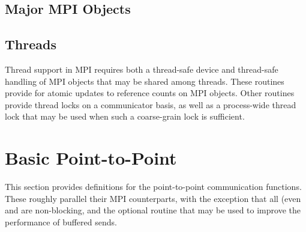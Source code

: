 \documentclass{article}
\begin{document}
\subsection{Major MPI Objects}





%
%
%
%
%
%
%






\subsection{Threads}
Thread support in MPI requires both a thread-safe device and
thread-safe handling of MPI objects that may be shared among threads.
These routines provide for atomic updates to reference counts on MPI
objects.  Other routines provide thread locks on a communicator basis,
as well as a process-wide thread lock that may be used when such a
coarse-grain lock is sufficient.







\section{Basic Point-to-Point}
\label{sec:pt-2-pt}
This section provides definitions for the point-to-point communication
functions.  These roughly parallel their MPI counterparts, with the 
exception that all (even  and  are
non-blocking, and the optional  routine that may be
used to improve the performance of buffered sends.















\end{document}
